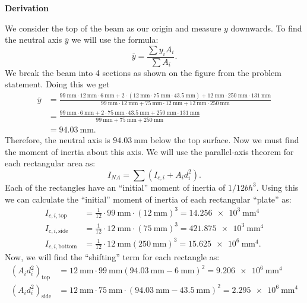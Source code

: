 \documentclass[a4paper]{article}
\newcounter{problem}
\numberwithin{equation}{problem}
\newcommand{\AUheading}[1]{%
  \par\vspace{.4\baselineskip}%
  {\sffamily\bfseries\color{AUblueDark}#1\par}%
  \nobreak%
}
\newenvironment{derivation}[1][Derivation]{%
  \AUheading{#1}
  \begingroup\allowdisplaybreaks
  \setlength{\abovedisplayskip}{6pt}%
  \setlength{\belowdisplayskip}{6pt}%
  \setlength{\abovedisplayshortskip}{4pt}%
  \setlength{\belowdisplayshortskip}{4pt}%
}{\par\endgroup\medskip}
\begin{document}
\begin{derivation}
  We consider the top of the beam as our origin and measure $y$ downwards.
  To find the neutral axis $\overline{y}$ we will use the formula:
  \[ 
  \overline{y} = \frac{\sum y_i A_i}{\sum A_i}
  .\]
  We break the beam into 4 sections as shown on the figure from the problem statement.
  Doing this we get
  \begin{align*}
    \overline{y} &= \frac{\qty{99}{\mm} \cdot \qty{12}{\mm} \cdot \qty{6}{\mm} + 2 \cdot \left( \qty{12}{\mm} \cdot \qty{75}{\mm} \cdot \qty{43,5}{\mm} \right) + \qty{12}{\mm} \cdot \qty{250}{\mm} \cdot \qty{131}{\mm}}{\qty{99}{\mm} \cdot \qty{12}{\mm} + \qty{75}{\mm} \cdot \qty{12}{\mm}  + \qty{12}{\mm} \cdot \qty{250}{\mm}} \\
                 &= \frac{\qty{99}{\mm} \cdot \qty{6}{\mm} + 2 \cdot \qty{75}{\mm} \cdot \qty{43,5}{\mm} + \qty{250}{\mm} \cdot \qty{131}{\mm} }{\qty{99}{\mm} + \qty{75}{\mm} + \qty{250}{\mm} } \\
                 &= \qty{94,03}{\mm} 
  .\end{align*}
  Therefore, the neutral axis is $\qty{94,03}{\mm}$ below the top surface.
  Now we must find the moment of inertia about this axis.
  We will use the parallel-axis theorem for each rectangular area as:
  \[ 
  I_{NA} = \sum \left( I_{c,i} + A_i d_i^2 \right)
  .\]
  Each of the rectangles have an ``initial'' moment of inertia of $1 / 12 bh^3$.
  Using this we can calculate the ``initial'' moment of inertia of each rectangular ``plate'' as:
  \begin{align*}
    I_{c, i, \text{top}} &= \frac{1}{12} \cdot \qty{99}{\mm} \cdot \left( \qty{12}{\mm}  \right)^3 = \qty{14,256e3}{\mm^{4}}  \\
    I_{c,i, \text{side}} &= \frac{1}{12} \cdot \qty{12}{\mm} \cdot (\qty{75}{\mm})^3 = \qty{421,875e3}{\mm^{4}} \\
    I_{c,i, \text{bottom}} &= \frac{1}{12} \cdot \qty{12}{\mm}  \left( \qty{250}{\mm}  \right)^3 = \qty{15,625e6}{\mm^{4}} 
  .\end{align*}
  Now, we will find the ``shifting'' term for each rectangle as:
  \begin{align*}
    \left( A_i d_i^2 \right)_{\text{top}} &= \qty{12}{\mm} \cdot \qty{99}{\mm} \left( \qty{94,03}{\mm} - \qty{6}{\mm} \right)^2 = \qty{9,206e6}{\mm^{4}} \\
    \left( A_i d_i^2 \right)_{\text{side}} &= \qty{12}{\mm} \cdot \qty{75}{\mm} \cdot \left( \qty{94,03}{\mm} - \qty{43,5}{\mm}  \right)^2 = \qty{2,295e6}{\mm^{4}} \\

\end{align*}
\end{derivation}
\end{document}
